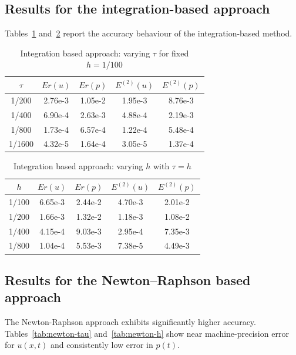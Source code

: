 \documentclass[reqno]{amsart}
\begin{document}
\subsection{Results for the integration-based approach}
Tables~\ref{tab:integration-tau} and~\ref{tab:integration-h} report the accuracy behaviour of the integration-based method.

\begin{table}[H]
\centering
\caption{Integration based approach: varying $\tau$ for fixed $h = 1/100$}
\label{tab:integration-tau}
\begin{tabular}{c|c|c|c|c}
\hline
$\tau$ & $Er(u)$ & $Er(p)$ & $E^{(2)}(u)$ & $E^{(2)}(p)$ \\
\hline
1/200  & 2.76e-3 & 1.05e-2 & 1.95e-3 & 8.76e-3 \\
1/400  & 6.90e-4 & 2.63e-3 & 4.88e-4 & 2.19e-3 \\
1/800  & 1.73e-4 & 6.57e-4 & 1.22e-4 & 5.48e-4 \\
1/1600 & 4.32e-5 & 1.64e-4 & 3.05e-5 & 1.37e-4 \\
\hline
\end{tabular}
\end{table}

\begin{table}[H]
\centering
\caption{Integration based approach: varying $h$ with $\tau = h$}
\label{tab:integration-h}
\begin{tabular}{c|c|c|c|c}
\hline
$h$ & $Er(u)$ & $Er(p)$ & $E^{(2)}(u)$ & $E^{(2)}(p)$ \\
\hline
1/100 & 6.65e-3 & 2.44e-2 & 4.70e-3 & 2.01e-2 \\
1/200 & 1.66e-3 & 1.32e-2 & 1.18e-3 & 1.08e-2 \\
1/400 & 4.15e-4 & 9.03e-3 & 2.95e-4 & 7.35e-3 \\
1/800 & 1.04e-4 & 5.53e-3 & 7.38e-5 & 4.49e-3 \\
\hline
\end{tabular}
\end{table}

\subsection{Results for the Newton--Raphson based approach}
The Newton-Raphson approach exhibits significantly higher accuracy. Tables~\ref{tab:newton-tau} and~\ref{tab:newton-h} show near machine-precision error for $u(x,t)$ and consistently low error in $p(t)$.
\end{document}
